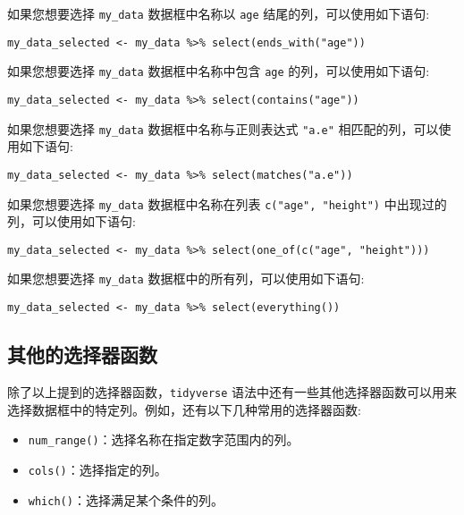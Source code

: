 \documentclass[
  letterpaper,
  DIV=11,
  numbers=noendperiod]{scrreprt}
\providecommand{\tightlist}{%
  \setlength{\itemsep}{0pt}\setlength{\parskip}{0pt}}\usepackage{longtable,booktabs,array}
\begin{document}
如果您想要选择 \texttt{my\_data} 数据框中名称以 \texttt{age}
结尾的列，可以使用如下语句:

\begin{verbatim}
my_data_selected <- my_data %>% select(ends_with("age"))
\end{verbatim}

如果您想要选择 \texttt{my\_data} 数据框中名称中包含 \texttt{age}
的列，可以使用如下语句:

\begin{verbatim}
my_data_selected <- my_data %>% select(contains("age"))
\end{verbatim}

如果您想要选择 \texttt{my\_data} 数据框中名称与正则表达式 \texttt{"a.e"}
相匹配的列，可以使用如下语句:

\begin{verbatim}
my_data_selected <- my_data %>% select(matches("a.e"))
\end{verbatim}

如果您想要选择 \texttt{my\_data} 数据框中名称在列表
\texttt{c("age",\ "height")} 中出现过的列，可以使用如下语句:

\begin{verbatim}
my_data_selected <- my_data %>% select(one_of(c("age", "height")))
\end{verbatim}

如果您想要选择 \texttt{my\_data} 数据框中的所有列，可以使用如下语句:

\begin{verbatim}
my_data_selected <- my_data %>% select(everything())
\end{verbatim}

\hypertarget{ux5176ux4ed6ux7684ux9009ux62e9ux5668ux51fdux6570}{%
\subsection{其他的选择器函数}\label{ux5176ux4ed6ux7684ux9009ux62e9ux5668ux51fdux6570}}

除了以上提到的选择器函数，\texttt{tidyverse}
语法中还有一些其他选择器函数可以用来选择数据框中的特定列。例如，还有以下几种常用的选择器函数:

\begin{itemize}
\tightlist
\item
  \texttt{num\_range()}：选择名称在指定数字范围内的列。
\item
  \texttt{cols()}：选择指定的列。
\item
  \texttt{which()}：选择满足某个条件的列。
\end{itemize}
\end{document}
